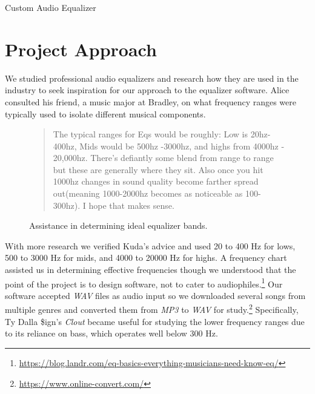 




%
%

\begin{Large}\begin{center}
Custom Audio Equalizer
\end{center}\end{Large}


%
%

\section{Project Approach}

\noindent We studied professional audio equalizers and research how they are used in the industry to seek inspiration for our approach to the equalizer software. Alice consulted his friend, a music major at Bradley, on what frequency ranges were typically used to isolate different musical components.

\begin{figure}[h!]
	\begin{quote}
	The typical ranges for Eqs would be roughly: Low is 20hz- 400hz, Mids would be 500hz -3000hz, and highs from 4000hz - 20,000hz. There’s defiantly some blend from range to range but these are generally where they sit. Also once you hit 1000hz changes in sound quality become farther spread out(meaning 1000-2000hz becomes as noticeable as 100-300hz). I hope that makes sense.
	\end{quote}
	\caption{Assistance in determining ideal equalizer bands.}
\end{figure}

With more research we verified Kuda's advice and used 20 to 400 Hz for lows, 500 to 3000 Hz for mids, and 4000 to 20000 Hz for highs. A frequency chart assisted us in determining effective frequencies though we understood that the point of the project is to design software, not to cater to audiophiles.\footnote{\url{https://blog.landr.com/eq-basics-everything-musicians-need-know-eq/}} Our software accepted \textit{WAV} files as audio input so we downloaded several songs from multiple genres and converted them from \textit{MP3} to \textit{WAV} for study.\footnote{\url{https://www.online-convert.com/}} Specifically, Ty Dalla \$ign's \textit{Clout} became useful for studying the lower frequency ranges due to its reliance on bass, which operates well below 300 Hz.

